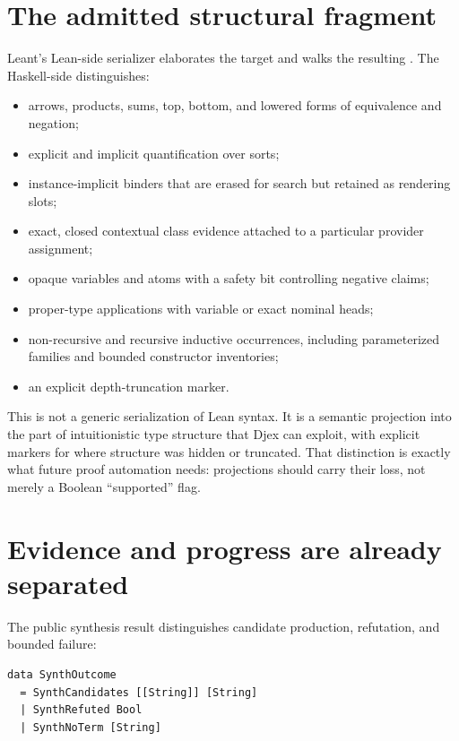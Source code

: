 \documentclass[11pt,letterpaper,openany]{report}
\newcommand{\code}[1]{\texttt{\detokenize{#1}}}
\begin{document}
\section{The admitted structural fragment}

Leant's Lean-side serializer elaborates the target and walks the resulting \code{Expr}.
The Haskell-side \code{Frag} distinguishes:

\begin{itemize}
  \item arrows, products, sums, top, bottom, and lowered forms of equivalence and
        negation;
  \item explicit and implicit quantification over sorts;
  \item instance-implicit binders that are erased for search but retained as rendering
        slots;
  \item exact, closed contextual class evidence attached to a particular provider
        assignment;
  \item opaque variables and atoms with a safety bit controlling negative claims;
  \item proper-type applications with variable or exact nominal heads;
  \item non-recursive and recursive inductive occurrences, including parameterized
        families and bounded constructor inventories;
  \item an explicit depth-truncation marker.
\end{itemize}

This is not a generic serialization of Lean syntax. It is a semantic projection into
the part of intuitionistic type structure that Djex can exploit, with explicit markers
for where structure was hidden or truncated. That distinction is exactly what future
proof automation needs: projections should carry their loss, not merely a Boolean
``supported'' flag.

\section{Evidence and progress are already separated}

The public synthesis result distinguishes candidate production, refutation, and
bounded failure:

\begin{lstlisting}[language=HaskellLite,caption={Simplified current Leant outcome type}]
data SynthOutcome
  = SynthCandidates [[String]] [String]
  | SynthRefuted Bool
  | SynthNoTerm [String]
\end{lstlisting}
\end{document}
